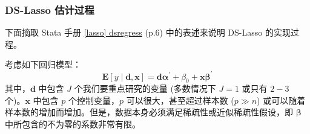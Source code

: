 %


\subsubsection{DS-Lasso 估计过程}
下面摘取 Stata 手册 \href{https://www.stata.com/manuals/lassodsregress.pdf}{[lasso] dsregress} (p.6) 中的表述来说明 DS-Lasso 的实现过程。

考虑如下回归模型：
\begin{equation}\label{eq:Lasso-DS-01}
	\mathbf{E}[y \mid \mathbf{d}, \mathbf{x}]=\mathbf{d} \boldsymbol{\alpha}^{\prime}+\beta_{0}+\mathbf{x} \boldsymbol{\beta}^{\prime}
\end{equation}
其中，$\mathbf{d}$ 中包含 $J$ 个我们要重点研究的变量 (多数情况下 $J=1$ 或只有 $2-3$ 个)。$\mathbf{x}$ 中包含 $p$ 个控制变量，$p$ 可以很大，甚至超过样本数 ($p\gg n$) 或可以随着样本数的增加而增加。但是，数据本身必须满足稀疏性或近似稀疏性假设，即 $\boldsymbol{\beta}$ 中所包含的不为零的系数非常有限。

